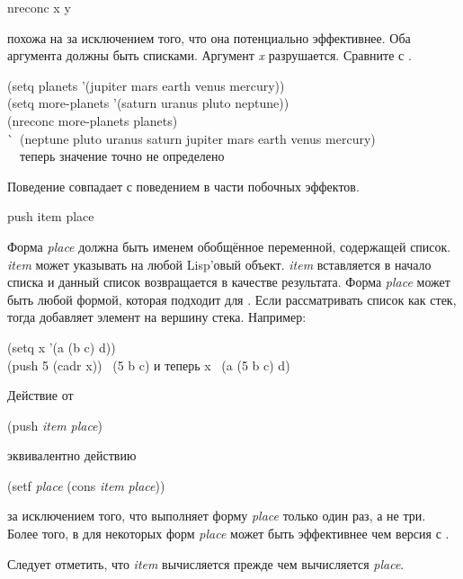 
\begin{defun}[Функция]
nreconc x y

 похожа на  за исключением того, что она потенциально эффективнее.
Оба аргумента должны быть списками. 
Аргумент \emph{x} разрушается.
Сравните с .

\begin{lisp}
(setq planets '(jupiter mars earth venus mercury)) \\
(setq more-planets '(saturn uranus pluto neptune)) \\
(nreconc more-planets planets) \\
\`\EV\ (neptune pluto uranus saturn jupiter mars earth venus mercury) \\
~~\textrm{теперь значение  точно не определено}
\end{lisp}

Поведение  совпадает с поведением  в части побочных эффектов.
\end{defun}

\begin{defmac}
push item place

Форма \emph{place} должна быть именем обобщённое переменной, содержащей
список. \emph{item} может указывать на любой Lisp'овый объект. \emph{item}
вставляется в начало списка и данный список возвращается в качестве результата.
Форма \emph{place} может
быть любой формой, которая подходит для .
Если рассматривать список как стек, тогда  добавляет элемент на
вершину стека.
Например:
\begin{lisp}
(setq x '(a (b c) d)) \\
(push 5 (cadr x)) \EV\ (5 b c)  \textrm{и теперь} x \EV\ (a (5 b c) d)
\end{lisp}
Действие от
\begin{lisp}
(push \emph{item} \emph{place})
\end{lisp}
эквивалентно действию
\begin{lisp}
(setf \emph{place} (cons \emph{item} \emph{place}))
\end{lisp}
за исключением того, что  выполняет форму \emph{place} только один раз,
а не три.
Более того, в для некоторых форм \emph{place}  может быть
эффективнее чем версия с .

Следует отметить, что \emph{item} вычисляется прежде чем вычисляется
\emph{place}.
\end{defmac}

